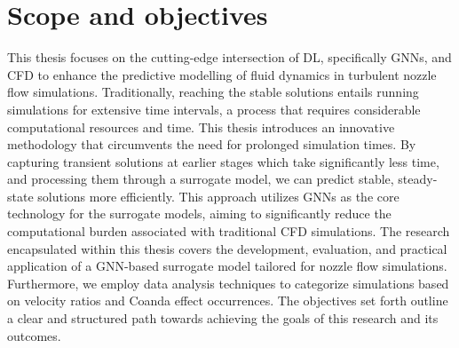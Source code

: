 \section{Scope and objectives}
This thesis focuses on the cutting-edge intersection of DL, specifically GNNs, and CFD to enhance the predictive modelling of fluid dynamics in turbulent nozzle flow simulations. Traditionally, reaching the stable solutions entails running simulations for extensive time intervals, a process that requires considerable computational resources and time. This thesis introduces an innovative methodology that circumvents the need for prolonged simulation times. By capturing transient solutions at earlier stages which take significantly less time, and processing them through a surrogate model, we can predict stable, steady-state solutions more efficiently. This approach utilizes GNNs as the core technology for the surrogate models, aiming to significantly reduce the computational burden associated with traditional CFD simulations. The research encapsulated within this thesis covers the development, evaluation, and practical application of a GNN-based surrogate model tailored for nozzle flow simulations. Furthermore, we employ data analysis techniques to categorize simulations based on velocity ratios and Coanda effect occurrences. The objectives set forth outline a clear and structured path towards achieving the goals of this research and its outcomes.
